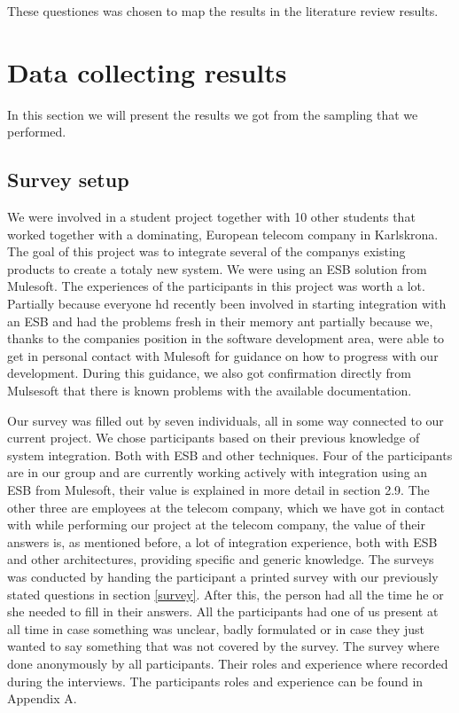 \documentclass{llncs}
\begin{document}
These questiones was chosen to map the results in the literature review results.


\section{Data collecting results}
In this section we will present the results we got from the sampling that we performed.
\subsection{Survey setup}

We were involved in a student project together with 10 other students that worked together with a dominating, European telecom company in Karlskrona. The goal of this project was to integrate several of the companys existing products to create a totaly new system. We were using an ESB solution from Mulesoft\cite{mule}. The experiences of the participants in this project was worth a lot. Partially because everyone hd recently been involved in starting integration with an ESB and had the problems fresh in their memory ant partially because we, thanks to the companies position in the software development area, were able to get in personal contact with Mulesoft for guidance on how to progress with our development. During this guidance, we also got confirmation directly from Mulsesoft that there is known problems with the available documentation.

Our survey was filled out by seven individuals, all in some way connected to our current project. We chose participants based on their previous knowledge of system integration. Both with ESB and other techniques. Four of the participants are in our group and are currently working actively with integration using an ESB from Mulesoft, their value is explained in more detail in section 2.9. The other three are employees at the telecom company, which we have got in contact with while performing our project at the telecom company, the value of their answers is, as mentioned before, a lot of integration experience, both with ESB and other architectures, providing specific and generic knowledge.
The surveys was conducted by handing the participant a printed survey with our previously stated questions  in section \ref{survey}. After this, the person had all the time he or she needed to fill in their answers.
All the participants had one of us present at all time in case something was unclear, badly formulated or in case they just wanted to say something that was not covered by the survey. The survey where done anonymously by all participants. Their roles and experience where recorded during the interviews. The participants roles and experience can be found in Appendix A.
\end{document}
